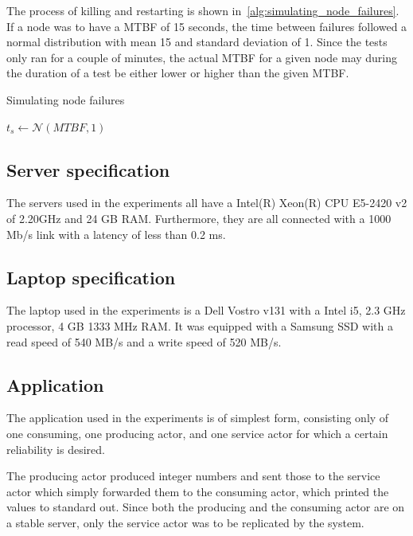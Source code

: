 \documentclass{cslthse-msc}
\begin{document}
The process of killing and restarting is shown in~\cref{alg:simulating_node_failures}. If a node was to have a MTBF of 15 seconds, the time between failures followed a normal distribution with mean 15 and standard deviation of 1. Since the tests only ran for a couple of minutes, the actual MTBF for a given node may during the duration of a test be either lower or higher than the given MTBF.

\begin{algorithm} 
	\caption{Simulating node failures} \label{alg:simulating_node_failures}
	\begin{algorithmic}[1]
		\State
		\State $t_{s}\gets \mathcal{N} (MTBF,1)$
		\State
		\State
	\EndWhile
	\end{algorithmic}
\end{algorithm}

\subsection{Server specification} \label{sec:server_spec}
The servers used in the experiments all have a Intel(R) Xeon(R) CPU E5-2420 v2 of 2.20GHz and 24 GB RAM. Furthermore, they are all connected with a 1000 Mb/s link with a latency of less than 0.2 ms. 

\subsection{Laptop specification} \label{sec:laptop_spec}
The laptop used in the experiments is a Dell Vostro v131 with a Intel i5, 2.3 GHz processor, 4 GB 1333 MHz RAM. It was equipped with a Samsung SSD with a read speed of 540 MB/s and a write speed of 520 MB/s. 

\subsection{Application} \label{sec:eval_application}
The application used in the experiments is of simplest form, consisting only of one consuming, one producing actor, and one service actor for which a certain reliability is desired. 

The producing actor produced integer numbers and sent those to the  service actor which simply forwarded them to the consuming actor, which printed the values to standard out. Since both the producing and the consuming actor are on a stable server, only the service actor was to be replicated by the system.
\end{document}
